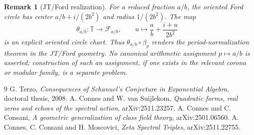 \documentclass[11pt]{article}
\newtheorem{remark}[definition]{Remark}
\newcommand{\T}{\mathbb T}
\begin{document}
\begin{remark}[JT/Ford realization]
For a reduced fraction $a/b$, the oriented Ford circle has center $a/b+i/(2b^2)$ and radius $1/(2b^2)$.  The map
\[
 \theta_{a/b}:\T\longrightarrow\mathcal F_{a/b},
 \qquad
 u\longmapsto \frac ab+\frac{i+u}{2b^2}
\]
is an explicit oriented circle chart.  Thus $\theta_{a/b}\circ\beta_p$ renders the period-normalization theorem in the JT/Ford geometry.  No canonical arithmetic assignment $p\mapsto a/b$ is asserted; construction of such an assignment, if one exists in the relevant corona or modular family, is a separate problem.
\end{remark}

\begin{thebibliography}{9}
 G. Terzo, \emph{Consequences of Schanuel's Conjecture in Exponential Algebra}, doctoral thesis, 2008.
 A. Connes and W. van Suijlekom, \emph{Quadratic forms, real zeros and echoes of the spectral action}, arXiv:2511.23257.
 A. Connes and C. Consani, \emph{A geometric generalization of class field theory}, arXiv:2501.06560.
 A. Connes, C. Consani and H. Moscovici, \emph{Zeta Spectral Triples}, arXiv:2511.22755.
\end{thebibliography}
\end{document}
